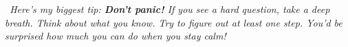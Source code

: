 {%
\begin{tcolorbox}[
    enhanced,
    colback=funPurple!8,
    colframe=funPurple!50,
    arc=10pt,
    boxrule=1.5pt,
    left=5mm, right=5mm, top=3mm, bottom=3mm,
]
    \begin{minipage}[c]{0.08\linewidth}
        \centering
        \iconOwl[1.2cm]
    \end{minipage}%
    \hfill
    \begin{minipage}[c]{0.88\linewidth}
        \small\itshape\color{funPurpleDark}
        \faQuoteLeft~Here's my biggest tip: \textbf{Don't panic!}
        If you see a hard question, take a deep breath. Think about what you know.
        Try to figure out at least one step. You'd be surprised how much you can
        do when you stay calm!~\faQuoteRight
    \end{minipage}
\end{tcolorbox}

}

\newpage
